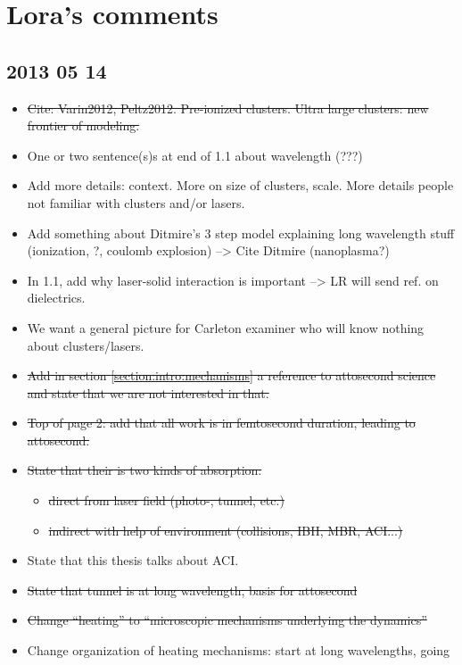 \section*{Lora's comments}

\subsection*{2013 05 14}

\begin{itemize}
\item \sout{Cite: Varin2012, Peltz2012. Pre-ionized
clusters. Ultra large clusters: new frontier of modeling.}
\item One or two sentence(s)s at end of 1.1 about wavelength (???)
\item Add more details: context. More on size of clusters, scale. More details
people not familiar with clusters and/or lasers.
\item Add something about Ditmire's 3 step model explaining long wavelength stuff
(ionization, ?, coulomb explosion) --> Cite Ditmire (nanoplasma?)
\item In 1.1, add why laser-solid interaction is important --> LR will send ref.
on dielectrics.
\item We want a general picture for Carleton examiner who will know nothing about
clusters/lasers.
\item \sout{Add in section \ref{section:intro:mechanisms} a reference to
attosecond science and state that we are not interested in that.}
\item \sout{Top of page 2: add that all work is in femtosecond duration, leading to
attosecond.}
\item \sout{State that their is two kinds of absorption:}
    \begin{itemize}
    \item \sout{direct from laser field (photo-, tunnel, etc.)}
    \item \sout{indirect with help of environment (collisions, IBH, MBR, ACI...)}
    \end{itemize}
\item State that this thesis talks about ACI.
\item \sout{State that tunnel is at long wavelength, basis for attosecond}
\item \sout{Change ``heating'' to ``microscopic mechanisms underlying the dynamics''}
\item Change organization of heating mechanisms: start at long wavelengths, going

\end{itemize}

